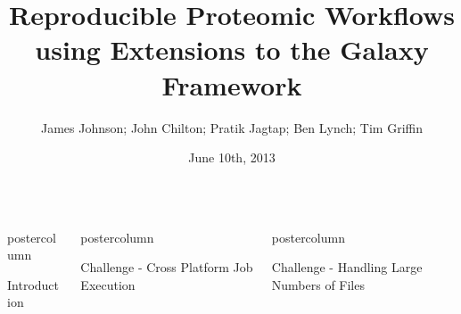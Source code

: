 \documentclass[final]{beamer}
\title[]{Reproducible Proteomic Workflows using Extensions to the Galaxy Framework}
\author[Johnson, Chilton, et al]{James Johnson; John Chilton; Pratik Jagtap; Ben Lynch; Tim Griffin}
\institute[University of Minnesota]{Supcomputing Institute}
\date{June 10th, 2013}
\newlength{\columnheight}
\begin{document}
\begin{frame}
  \begin{columns}

    \begin{column}{.33\textwidth}
      \begin{beamercolorbox}[center,wd=\textwidth]{postercolumn}
        \begin{minipage}[T]{.95\textwidth}  %
          \parbox[t][\columnheight]{\textwidth}{
            \begin{block}{Introduction}

            \end{block}
            \vfill
          }
        \end{minipage}
      \end{beamercolorbox}
    \end{column}

    \begin{column}{.33\textwidth}
      \begin{beamercolorbox}[center,wd=\textwidth]{postercolumn}
        \begin{minipage}[T]{.95\textwidth} %
          \parbox[t][\columnheight]{\textwidth}{
            \begin{block}{Challenge - Cross Platform Job Execution}

            \end{block}

            \vfill
          }
        \end{minipage}
      \end{beamercolorbox}
    \end{column}              

    \begin{column}{.33\textwidth}
      \begin{beamercolorbox}[center,wd=\textwidth]{postercolumn}
        \begin{minipage}[T]{.95\textwidth} %
          \parbox[t][\columnheight]{\textwidth}{
            \begin{block}{Challenge - Handling Large Numbers of Files}

            \end{block}

            \vfill
          }
        \end{minipage}
      \end{beamercolorbox}
    \end{column}              

  \end{columns}   
\end{frame}
\end{document}
